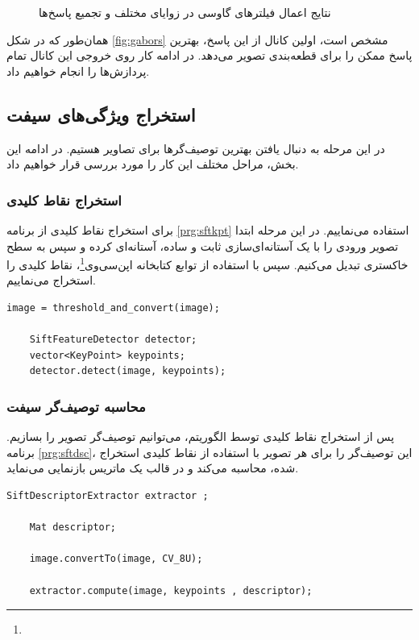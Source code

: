 \documentclass[11.5pt,a4paper]{article}
\newcommand{\enfootnote}[1]{\footnote{\lr{#1}}}
\begin{document}
\begin{figure}[h]
	\caption{نتایج اعمال فیلترهای گاوسی در زوایای مختلف و تجمیع پاسخ‌ها}

\label{fig:bsl1}
\end{figure}

همان‌طور که در شکل \ref{fig:gabors} مشخص است، اولین کانال از این پاسخ، بهترین پاسخ ممکن را برای قطعه‌بندی تصویر می‌دهد. در ادامه کار روی خروجی این کانال تمام پردازش‌ها را انجام خواهیم داد.

\subsection{استخراج ویژگی‌های سیفت}
در این مرحله به دنبال یافتن بهترین توصیف‌گرها برای تصاویر هستیم. در ادامه این بخش، مراحل مختلف این کار را مورد بررسی قرار خواهیم داد.

\subsubsection{استخراج نقاط کلیدی}
 برای استخراج نقاط کلیدی از برنامه \ref{prg:sftkpt} استفاده می‌نماییم. در این مرحله ابتدا تصویر ورودی را با یک آستانه‌ای‌سازی ثابت و ساده، آستانه‌ای کرده و سپس به سطح خاکستری تبدیل می‌کنیم. سپس با استفاده از توابع کتابخانه اپن‌سی‌وی\enfootnote{OpenCV}، نقاط کلیدی را استخراج می‌نماییم.

 \begin{LTR}
    \begin{lstlisting}[style=C++Style,caption=\rl{استخراج نقاط کلیدی}]
	image = threshold_and_convert(image);

	SiftFeatureDetector detector;
    vector<KeyPoint> keypoints;
    detector.detect(image, keypoints);
    \end{lstlisting}
    \label{prg:sftkpt}
  \end{LTR}

\subsubsection{محاسبه توصیف‌گر سیفت}
 
 پس از استخراج نقاط کلیدی توسط الگوریتم، می‌توانیم توصیف‌گر تصویر را بسازیم. برنامه \ref{prg:sftdsc}، این توصیف‌گر را برای هر تصویر با استفاده از نقاط کلیدی استخراج شده، محاسبه می‌کند و در قالب یک ماتریس بازنمایی می‌نماید.
 
 
 \begin{LTR}
    \begin{lstlisting}[style=C++Style,caption=\rl{محاسبه توصیف‌گر سیفت}]
 	SiftDescriptorExtractor extractor ;

	Mat descriptor;

	image.convertTo(image, CV_8U);

	extractor.compute(image, keypoints , descriptor);
    \end{lstlisting}
    \label{prg:sftdsc}
  \end{LTR}
\end{document}
